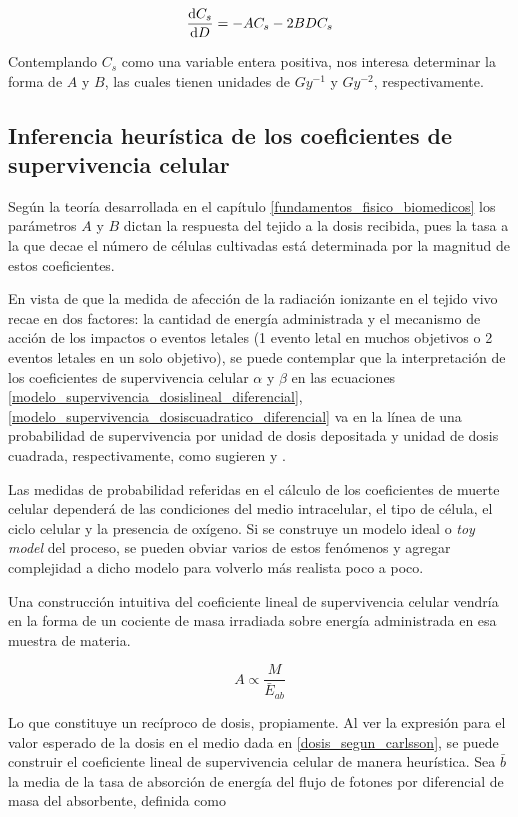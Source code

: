 \documentclass[12pt,letterpaper, oneside]{book}
\begin{document}
	\begin{equation}
		\dv{C_s}{D}=-A C_s -2B DC_s\label{modelo_supervivencia_dosiscuadratico_diferencial}
	\end{equation}
	
	\noindent Contemplando $C_s$ como una variable entera positiva, nos interesa determinar la forma de $A$ y $B$, las cuales tienen unidades de $\unit{Gy^{-1}}$ y $\unit{Gy^{-2}}$, respectivamente. 
	
	\subsection{Inferencia heurística de los coeficientes de supervivencia celular}\label{inferencia_heuristica_coeficientes}
	Según la teoría desarrollada en el capítulo \ref{fundamentos_fisico_biomedicos} los parámetros $A$ y $B$ dictan la respuesta del tejido a la dosis recibida, pues la tasa a la que decae el número de células cultivadas está determinada por la magnitud de estos coeficientes. 
	
	En vista de que la medida de afección de la radiación ionizante en el tejido vivo recae en dos factores: la cantidad de energía administrada y el mecanismo de acción de los impactos o eventos letales (1 evento letal en muchos objetivos o 2 eventos letales en un solo objetivo), se puede contemplar que la interpretación de los coeficientes de supervivencia celular $\alpha$ y $\beta$ en las ecuaciones \ref{modelo_supervivencia_dosislineal_diferencial}, \ref{modelo_supervivencia_dosiscuadratico_diferencial} va en la línea de una probabilidad de supervivencia por unidad de dosis depositada y unidad de dosis cuadrada, respectivamente, como sugieren \cite{Tubiana.1990} y \cite{McMahon.2018}. 
	
	Las medidas de probabilidad referidas en el cálculo de los coeficientes de muerte celular dependerá de las condiciones del medio intracelular, el tipo de célula, el ciclo celular y la presencia de oxígeno. Si se construye un modelo ideal o \textit{toy model} del proceso, se pueden obviar varios de estos fenómenos y agregar complejidad a dicho modelo para volverlo más realista poco a poco. 
	
	Una construcción intuitiva del coeficiente lineal de supervivencia celular vendría en la forma de un cociente de masa irradiada sobre energía administrada en esa muestra de materia. 
	
	$$A\propto\frac{M}{\bar{E}_{ab}}$$
		
	Lo que constituye un recíproco de dosis, propiamente. Al ver la expresión para el valor esperado de la dosis en el medio dada en \ref{dosis_segun_carlsson}, se puede construir el coeficiente lineal de supervivencia celular de manera heurística. Sea $\bar{b}$ la media de la tasa de absorción de energía del flujo de fotones por diferencial de masa del absorbente, definida como
\end{document}
